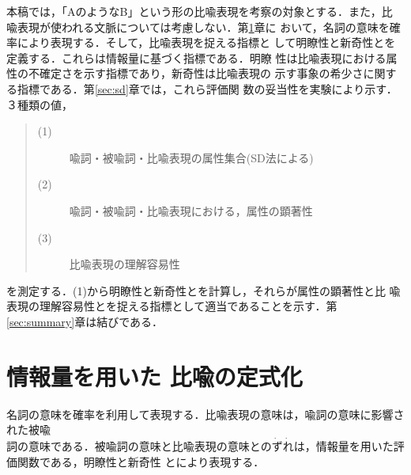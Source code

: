 本稿では，「AのようなB」という形の比喩表現を考察の対象とする．また，比
喩表現が使われる文脈については考慮しない．第\ref{sec:formulation}章に
おいて，名詞の意味を確率により表現する．そして，比喩表現を捉える指標と
して明瞭性と新奇性とを定義する．これらは情報量に基づく指標である．明瞭
性は比喩表現における属性の不確定さを示す指標であり，新奇性は比喩表現の
示す事象の希少さに関する指標である．第\ref{sec:sd}章では，これら評価関
数の妥当性を実験により示す．３種類の値，
\begin{quote}
  \begin{description}
  \item[(1)] 喩詞・被喩詞・比喩表現の属性集合(SD法による\cite{Osgood57})
  \item[(2)] 喩詞・被喩詞・比喩表現における，属性の顕著性
  \item[(3)] 比喩表現の理解容易性
  \end{description}
\end{quote}
を測定する．(1)から明瞭性と新奇性とを計算し，それらが属性の顕著性と比
喩表現の理解容易性とを捉える指標として適当であることを示す．第
\ref{sec:summary}章は結びである．

\section{情報量を用いた 比喩の定式化}
\label{sec:formulation}

名\hspace{0.2mm}詞の意\hspace{0.2mm}味\hspace{0.1mm}を\hspace{0.1mm}確\hspace{0.2mm}率を利\hspace{0.2mm}用して表\hspace{0.2mm}現する．比\hspace{0.1mm}喩\hspace{0.1mm}表\hspace{0.1mm}現\hspace{0.1mm}の意\hspace{0.2mm}味は，喩\hspace{0.2mm}詞の意\hspace{0.2mm}味に影\hspace{0.2mm}響された被\hspace{0.2mm}喩\\詞の意味である．被喩詞の意味と比喩表現の意味との$\dot{\mbox
{ず}}\dot{\mbox{れ}}$は，情報量を用いた評価関数である，明瞭性と新奇性
とにより表現する\cite{Utiyama95a,Utiyama95b}．

